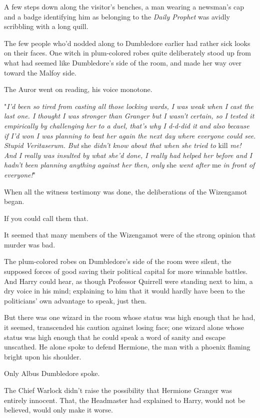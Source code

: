A few steps down along the visitor's benches, a man wearing a newsman's cap and 
a badge identifying him as belonging to the \emph{Daily Prophet} was avidly 
scribbling with a long quill.

The few people who'd nodded along to Dumbledore earlier had rather sick looks 
on their faces. One witch in plum-colored robes quite deliberately stood up 
from what had seemed like Dumbledore's side of the room, and made her way over 
toward the Malfoy side.

The Auror went on reading, his voice monotone.

"\emph{I'd been so tired from casting all those locking wards, I was weak when I 
cast the last one. I thought I was stronger than Granger but I wasn't certain, 
so I tested it empirically by challenging her to a duel, that's why I d-d-did 
it and also because if I'd won I was planning to beat her again the next day 
where everyone could see. Stupid Veritaserum. But} she\emph{ didn't know about 
that when she tried to} kill\emph{ me! And I really was insulted by what she'd 
done, I really had helped her before and I hadn't been planning anything 
against her then, only} she\emph{ went after} me\emph{ in front of everyone!}"

When all the witness testimony was done, the deliberations of the Wizengamot 
began.

If you could call them that.

It seemed that many members of the Wizengamot were of the strong opinion that 
murder was bad.

The plum-colored robes on Dumbledore's side of the room were silent, the 
supposed forces of good saving their political capital for more winnable 
battles. And Harry could hear, as though Professor Quirrell were standing next 
to him, a dry voice in his mind; explaining to him that it would hardly have 
been to the politicians' own advantage to speak, just then.

But there was one wizard in the room whose status was high enough that he had, 
it seemed, transcended his caution against losing face; one wizard alone whose 
status was high enough that he could speak a word of sanity and escape 
unscathed. He alone spoke to defend Hermione, the man with a phoenix flaming 
bright upon his shoulder.

Only Albus Dumbledore spoke.

The Chief Warlock didn't raise the possibility that Hermione Granger was 
entirely innocent. That, the Headmaster had explained to Harry, would not be 
believed, would only make it worse.

